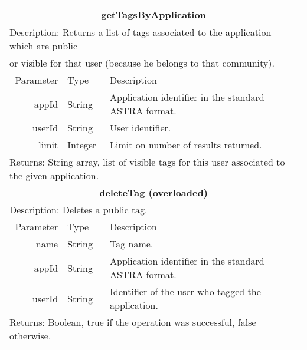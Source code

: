 \begin{table}[h!]
	\small
    \begin{center}
		\begin{tabular}{||r|l|l||}
        
       
		\hline \hline
		\multicolumn{3}{||c||}{\bfseries{getTagsByApplication}} \\
		\hline
		\hline 
		\multicolumn{3}{||l||}{Description: Returns a list of tags associated to 
		the application	which are public} \\ 
		\multicolumn{3}{||l||}{or visible for that user (because he belongs to
		that community).} \\ \hline \hline 
			Parameter & Type & Description \\
		\hline \hline
			appId & String & Application identifier in the standard ASTRA format. \\
			userId & String & User identifier. \\
			limit & Integer & Limit on number of results returned. \\
		\hline \hline
		\multicolumn{3}{||l||}{Returns: String array, list of visible tags for this
		user associated to the given application.}
		\\
		\hline
		\hline
		
		
		\hline \hline
		\multicolumn{3}{||c||}{\bfseries{deleteTag (overloaded)}} \\
		\hline
		\hline 
		\multicolumn{3}{||l||}{Description: Deletes a public tag.} \\
		\hline \hline
			Parameter & Type & Description \\
		\hline \hline
			name & String & Tag name. \\
			appId & String & Application identifier in the standard ASTRA format. \\
			userId & String & Identifier of the user who tagged the application. \\
		\hline \hline
		\multicolumn{3}{||l||}{Returns: Boolean, true if the operation was successful,
		false otherwise.} \\ \hline \hline
		

\end{tabular}
\end{center}
\end{table}
